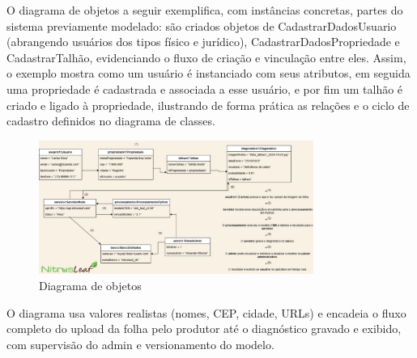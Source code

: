 O diagrama de objetos a seguir exemplifica, com instâncias concretas, partes do sistema previamente modelado:
são criados objetos de CadastrarDadosUsuario (abrangendo usuários dos tipos físico e jurídico), 
CadastrarDadosPropriedade e CadastrarTalhão, evidenciando o fluxo de criação e vinculação entre eles. Assim, 
o exemplo mostra como um usuário é instanciado com seus atributos, em seguida uma propriedade é cadastrada e 
associada a esse usuário, e por fim um talhão é criado e ligado à propriedade, ilustrando de forma prática 
as relações e o ciclo de cadastro definidos no diagrama de classes.

\begin{figure}[H]
\centering
\caption{Diagrama de objetos}%
\label{fig:diagrama-objetos}
\includegraphics[width=0.8\textwidth]{Images/DiagramaDeObjetos.jpg}
\end{figure}

O diagrama usa valores realistas (nomes, CEP, cidade, URLs) e encadeia o fluxo completo
do upload da folha pelo produtor até o diagnóstico gravado e exibido, com supervisão do admin
e versionamento do modelo.
\medskip